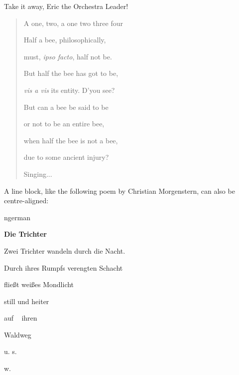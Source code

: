 \documentclass[a4paper]{memoir}
\newenvironment{DUlineblock}[1]{%
    \list{}{\setlength{\partopsep}{\parskip}
            \addtolength{\partopsep}{\baselineskip}
            \setlength{\topsep}{0pt}
            \setlength{\itemsep}{0.15\baselineskip}
            \setlength{\parsep}{0pt}
            \setlength{\leftmargin}{#1}}
    \raggedright
  }
  {\endlist}
\begin{document}
Take it away, Eric the Orchestra Leader!

\begin{quote}
\begin{DUlineblock}{0em}
\item[] A one, two, a one two three four
\item[] 
\item[] Half a bee, philosophically,
\item[]
\begin{DUlineblock}{\DUlineblockindent}
\item[] must, \emph{ipso facto}, half not be.
\end{DUlineblock}
\item[] But half the bee has got to be,
\item[]
\begin{DUlineblock}{\DUlineblockindent}
\item[] \emph{vis a vis} its entity.  D'you see?
\item[] 
\end{DUlineblock}
\item[] But can a bee be said to be
\item[]
\begin{DUlineblock}{\DUlineblockindent}
\item[] or not to be an entire bee,
\item[]
\begin{DUlineblock}{\DUlineblockindent}
\item[] when half the bee is not a bee,
\item[]
\begin{DUlineblock}{\DUlineblockindent}
\item[] due to some ancient injury?
\item[] 
\end{DUlineblock}
\end{DUlineblock}
\end{DUlineblock}
\item[] Singing...
\end{DUlineblock}
\end{quote}

A line block, like the following poem by Christian Morgenstern, can
also be centre-aligned:

\begin{selectlanguage}{ngerman}
\begin{DUlineblock}{0em}
\centering
\item[] \textbf{Die Trichter}
\item[] 
\item[] Zwei Trichter wandeln durch die Nacht.
\item[] Durch ihres Rumpfs verengten Schacht
\item[] fließt weißes Mondlicht
\item[] still und heiter
\item[] auf   ihren
\item[] Waldweg
\item[] u. s.
\item[] w.
\item[] 
\end{DUlineblock}
\end{selectlanguage}
\end{document}
